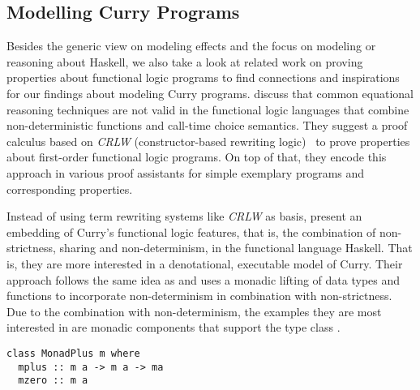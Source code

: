 \subsection{Modelling Curry Programs}

Besides the generic view on modeling effects and the focus on modeling or reasoning about Haskell, we also take a look at related work on proving properties about functional logic programs to find connections and inspirations for our findings about modeling Curry programs.
\citet{cleva2004logic} discuss that common equational reasoning techniques are not valid in the functional logic languages that combine non-deterministic functions and call-time choice semantics.
They suggest a proof calculus based on \emph{CRLW} (constructor-based rewriting logic)~\citep{gonzalez1996rewriting} to prove properties about first-order functional logic programs.
On top of that, they encode this approach in various proof assistants for simple exemplary programs and corresponding properties.

Instead of using term rewriting systems like \emph{CRLW} as basis, \citet{fischer2009purely} present an embedding of Curry's functional logic features, that is, the combination of non-strictness, sharing and non-determinism, in the functional language Haskell.
That is, they are more interested in a denotational, executable model of Curry.
Their approach follows the same idea as \citet{abel2005verifying} and uses a monadic lifting of data types and functions to incorporate non-determinism in combination with non-strictness.
Due to the combination with non-determinism, the examples they are most interested in are monadic components that support the type class .

\begin{verbatim}
class MonadPlus m where
  mplus :: m a -> m a -> ma
  mzero :: m a
\end{verbatim}

